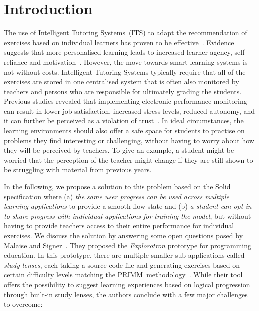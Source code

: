 \section{Introduction}
The use of Intelligent Tutoring Systems~(ITS) to adapt the recommendation of exercises based on individual learners has proven to be effective~\cite{kulik2016effectiveness}. Evidence suggests that more personalised learning leads to increased learner agency, self-reliance and motivation~\cite{prain2013personalised}. However, the move towards smart learning systems is not without costs. Intelligent Tutoring Systems typically require that all of the exercises are stored in one centralised system that is often also monitored by teachers and persons who are responsible for ultimately grading the students. Previous studies revealed that implementing electronic performance monitoring can result in lower job satisfaction, increased stress levels, reduced autonomy, and it can further be perceived as a violation of trust~\cite{siegel2022impact}. In ideal circumstances, the learning environments should also offer a safe space for students to practise on problems they find interesting or challenging, without having to worry about how they will be perceived by teachers. To give an example, a student might be worried that the perception of the teacher might change if they are still shown to be struggling with material from previous years.


In the following, we propose a solution to this problem based on the Solid specification where (a) \emph{the same user progress can be used across multiple learning applications} to provide a smooth flow state and (b) \emph{a student can opt in to share progress with individual applications for training the model}, but without having to provide teachers access to their entire performance for individual exercises. We discuss the solution by answering some open questions posed by Malaise and Signer~\cite{Malaise2023Explorotron}. They proposed the \emph{Explorotron} prototype for programming education. In this prototype, there are multiple smaller sub-applications called \emph{study lenses}, each taking a source code file and generating exercises based on certain difficulty levels matching the \mbox{PRIMM}~methodology~\cite{sentance2019teaching}. While their tool offers the possibility to suggest learning experiences based on logical progression through built-in study lenses, the authors conclude with a few major challenges to overcome:

